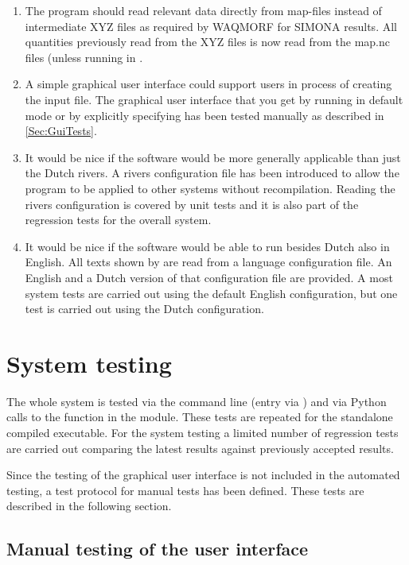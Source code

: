 \begin{enumerate}
\item The program should read relevant data directly from \dflowfm map-files instead of intermediate XYZ files as required by WAQMORF for SIMONA results.
All quantities previously read from the XYZ files is now read from the \dflowfm map.nc files (unless running in .

\item A simple graphical user interface could support users in process of creating the input file.
The graphical user interface that you get by running \dfastmi in default mode or by explicitly specifying  has been tested manually as described in \autoref{Sec:GuiTests}.

\item It would be nice if the software would be more generally applicable than just the Dutch rivers.
A rivers configuration file has been introduced to allow the program to be applied to other systems without recompilation.
Reading the rivers configuration is covered by unit tests and it is also part of the regression tests for the overall system.

\item It would be nice if the software would be able to run besides Dutch also in English.
All texts shown by \dfastmi are read from a language configuration file.
An English and a Dutch version of that configuration file are provided.
A most system tests are carried out using the default English configuration, but one test is carried out using the Dutch configuration.
\end{enumerate}

\section{System testing}

The whole system is tested via the command line (entry via ) and via Python calls to the  function in the  module.
These tests are repeated for the standalone compiled \dfastmi executable.
For the system testing a limited number of regression tests are carried out comparing the latest results against previously accepted results.

Since the testing of the graphical user interface is not included in the automated testing, a test protocol for manual tests has been defined.
These tests are described in the following section.

\subsection{Manual testing of the user interface} \label{Sec:GuiTests}

